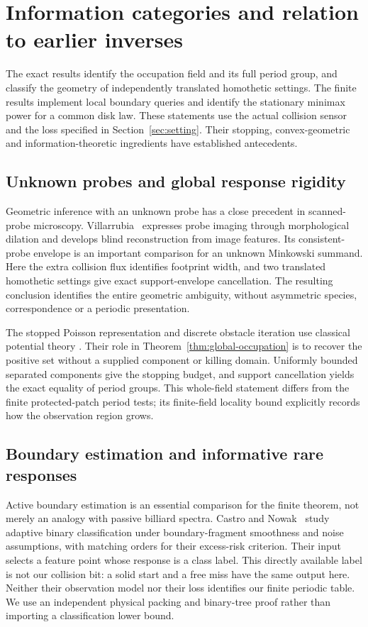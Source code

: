 \section{Information categories and relation to earlier inverses}
\label{sec:comparison}
The exact results identify the occupation field and its full period
group, and classify the geometry of independently translated
homothetic settings. The finite results implement local boundary
queries and identify the stationary minimax power for a common disk
law. These statements use the actual collision sensor and the loss
specified in Section~\ref{sec:setting}. Their stopping,
convex-geometric and information-theoretic ingredients have
established antecedents.

\subsection{Unknown probes and global response rigidity}
Geometric inference with an unknown probe has a close precedent in
scanned-probe microscopy. Villarrubia~\cite{Villarrubia} expresses
probe imaging through morphological dilation and develops blind
reconstruction from image features. Its consistent-probe envelope
is an important comparison for an unknown Minkowski summand.
Here the extra collision flux identifies footprint width, and two
translated homothetic settings give exact support-envelope
cancellation. The resulting conclusion identifies the entire
geometric ambiguity, without asymmetric species, correspondence or a
periodic presentation.

The stopped Poisson representation and discrete obstacle iteration
use classical potential theory \cite{LawlerLimic}. Their role in
Theorem~\ref{thm:global-occupation} is to recover the positive set
without a supplied component or killing domain. Uniformly bounded
separated components give the stopping budget, and support
cancellation yields the exact equality of period groups. This
whole-field statement differs from the finite protected-patch
period tests; its finite-field locality bound explicitly records
how the observation region grows.

\subsection{Boundary estimation and informative rare responses}
Active boundary estimation is an essential comparison for the finite
theorem, not merely an analogy with passive billiard spectra.
Castro and Nowak~\cite{CN} study adaptive binary classification under
boundary-fragment smoothness and noise assumptions, with matching
orders for their excess-risk criterion. Their input selects a feature
point whose response is a class label. This directly available label
is not our collision bit: a solid start and a free miss have the same
output here. Neither their observation model nor their loss identifies
our finite periodic table. We use an independent physical packing and
binary-tree proof rather than importing a classification lower bound.

